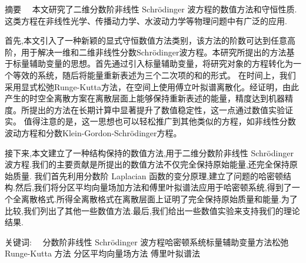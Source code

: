 
\begin{ChineseAbstract}[副教授]%
\item {\heiti 摘要\ \ }
本文研究了二维分数阶非线性 Schr{\"o}dinger 波方程的数值方法和守恒性质.这类方程在非线性光学、传播动力学、水波动力学等物理问题中有广泛的应用.

首先,本文引入了一种新颖的显式守恒数值方法类别，该方法的阶数可达到任意高阶，用于解决一维和二维非线性分数Schr{\"o}dinger波方程。本研究所提出的方法基于标量辅助变量的思想。首先通过引入标量辅助变量，将研究对象的方程转化为一个等效的系统，随后将能量重新表述为三个二次项的和的形式。
在时间上，我们采用显式松弛Runge-Kutta方法，在空间上使用傅立叶拟谱离散化。经证明，由此产生的时空全离散方案在离散层面上能够保持重新表述的能量，精度达到机器精度。所提出的方法在长期计算中显著提升了数值稳定性，这一点通过数值实验证实。
值得注意的是，这一思想也可以轻松推广到其他类似的方程，如非线性分数波动方程和分数Klein-Gordon-Schr{\"o}dinger方程。

接下来,本文建立了一种结构保持的数值方法,用于二维分数阶非线性 Schr{\"o}dinger 波方程.我们的主要贡献是所提出的数值方法不仅完全保持原始能量,还完全保持原始质量.
我们首先利用分数阶 Laplacian 函数的变分原理,建立了问题的哈密顿结构.然后,我们将分区平均向量场加方法和傅里叶拟谱法应用于哈密顿系统,得到了一个全离散格式.所得全离散格式在离散层面上证明了完全保持原始质量和能量.为了比较,我们列出了其他一些数值方法.最后,我们给出一些数值实验来支持我们的理论结果.

\item {\heiti 关键词:\ \ } 分数阶非线性 Schr{\"o}dinger 波方程\qquad 哈密顿系统\qquad 标量辅助变量方法\qquad 松弛 Runge-Kutta 方法 \qquad 分区平均向量场方法 \qquad 傅里叶拟谱法
\end{ChineseAbstract}

